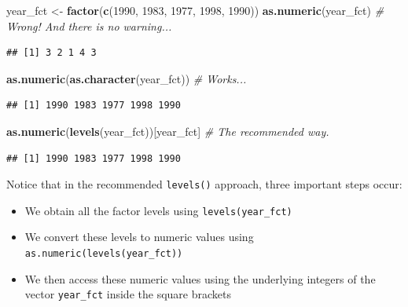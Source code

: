 \documentclass[]{book}
\newenvironment{Shaded}{\begin{snugshade}}{\end{snugshade}}
\newcommand{\KeywordTok}[1]{\textcolor[rgb]{0.13,0.29,0.53}{\textbf{#1}}}
\newcommand{\DecValTok}[1]{\textcolor[rgb]{0.00,0.00,0.81}{#1}}
\newcommand{\StringTok}[1]{\textcolor[rgb]{0.31,0.60,0.02}{#1}}
\newcommand{\CommentTok}[1]{\textcolor[rgb]{0.56,0.35,0.01}{\textit{#1}}}
\newcommand{\NormalTok}[1]{#1}
\providecommand{\tightlist}{%
  \setlength{\itemsep}{0pt}\setlength{\parskip}{0pt}}
\begin{document}
\begin{Shaded}
\begin{Highlighting}[]
\NormalTok{year_fct <-}\StringTok{ }\KeywordTok{factor}\NormalTok{(}\KeywordTok{c}\NormalTok{(}\DecValTok{1990}\NormalTok{, }\DecValTok{1983}\NormalTok{, }\DecValTok{1977}\NormalTok{, }\DecValTok{1998}\NormalTok{, }\DecValTok{1990}\NormalTok{))}
\KeywordTok{as.numeric}\NormalTok{(year_fct)                     }\CommentTok{# Wrong! And there is no warning...}
\end{Highlighting}
\end{Shaded}

\begin{verbatim}
## [1] 3 2 1 4 3
\end{verbatim}

\begin{Shaded}
\begin{Highlighting}[]
\KeywordTok{as.numeric}\NormalTok{(}\KeywordTok{as.character}\NormalTok{(year_fct))       }\CommentTok{# Works...}
\end{Highlighting}
\end{Shaded}

\begin{verbatim}
## [1] 1990 1983 1977 1998 1990
\end{verbatim}

\begin{Shaded}
\begin{Highlighting}[]
\KeywordTok{as.numeric}\NormalTok{(}\KeywordTok{levels}\NormalTok{(year_fct))[year_fct]   }\CommentTok{# The recommended way.}
\end{Highlighting}
\end{Shaded}

\begin{verbatim}
## [1] 1990 1983 1977 1998 1990
\end{verbatim}

Notice that in the recommended \texttt{levels()} approach, three
important steps occur:

\begin{itemize}
\tightlist
\item
  We obtain all the factor levels using \texttt{levels(year\_fct)}
\item
  We convert these levels to numeric values using
  \texttt{as.numeric(levels(year\_fct))}
\item
  We then access these numeric values using the underlying integers of
  the vector \texttt{year\_fct} inside the square brackets
\end{itemize}
\end{document}
